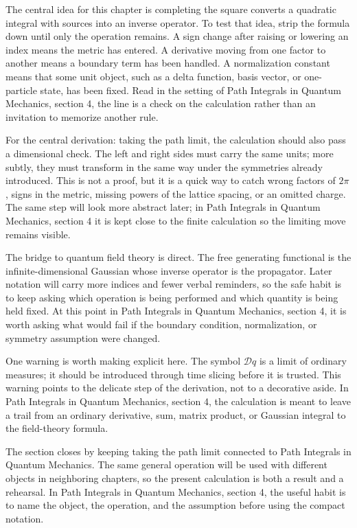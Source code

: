 The central idea for this chapter is completing the square converts a quadratic integral with sources into an inverse operator.  To test that idea, strip the formula down until only the operation remains.  A sign change after raising or lowering an index means the metric has entered.  A derivative moving from one factor to another means a boundary term has been handled.  A normalization constant means that some unit object, such as a delta function, basis vector, or one-particle state, has been fixed.  Read in the setting of Path Integrals in Quantum Mechanics, section 4, the line is a check on the calculation rather than an invitation to memorize another rule.

For the central derivation: taking the path limit, the calculation should also pass a dimensional check.  The left and right sides must carry the same units; more subtly, they must transform in the same way under the symmetries already introduced.  This is not a proof, but it is a quick way to catch wrong factors of \(2\pi\), signs in the metric, missing powers of the lattice spacing, or an omitted charge.  The same step will look more abstract later; in Path Integrals in Quantum Mechanics, section 4 it is kept close to the finite calculation so the limiting move remains visible.

The bridge to quantum field theory is direct.  The free generating functional is the infinite-dimensional Gaussian whose inverse operator is the propagator.  Later notation will carry more indices and fewer verbal reminders, so the safe habit is to keep asking which operation is being performed and which quantity is being held fixed.  At this point in Path Integrals in Quantum Mechanics, section 4, it is worth asking what would fail if the boundary condition, normalization, or symmetry assumption were changed.

One warning is worth making explicit here.  The symbol \(\mathcal D q\) is a limit of ordinary measures; it should be introduced through time slicing before it is trusted.  This warning points to the delicate step of the derivation, not to a decorative aside.  In Path Integrals in Quantum Mechanics, section 4, the calculation is meant to leave a trail from an ordinary derivative, sum, matrix product, or Gaussian integral to the field-theory formula.

The section closes by keeping taking the path limit connected to Path Integrals in Quantum Mechanics.  The same general operation will be used with different objects in neighboring chapters, so the present calculation is both a result and a rehearsal.  In Path Integrals in Quantum Mechanics, section 4, the useful habit is to name the object, the operation, and the assumption before using the compact notation.



